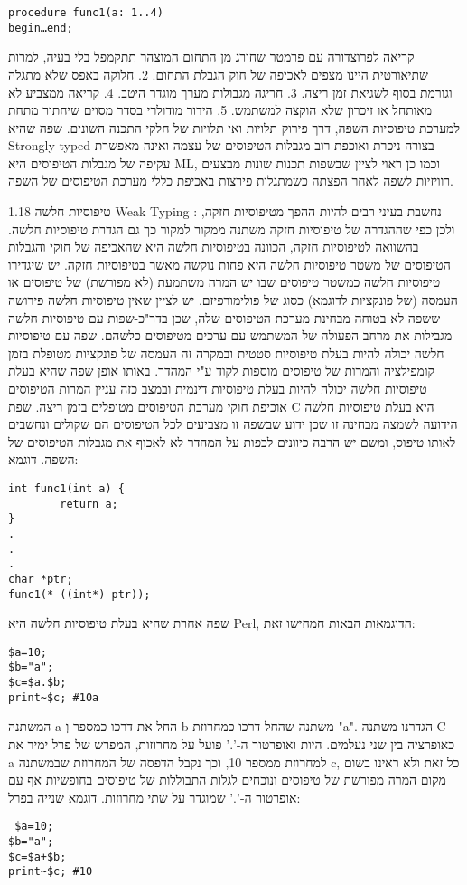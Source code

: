 \begin{verbatim}
procedure func1(a: 1..4)
begin…end;
\end{verbatim}

      קריאה לפרוצדורה עם פרמטר שחורג מן התחום המוצהר תתקמפל בלי בעיה, למרות שתיאורטית היינו מצפים לאכיפה של חוק הגבלת התחום.
      2. חלוקה באפס שלא מתגלה וגורמת בסוף לשגיאת זמן ריצה.
      3. חריגה מגבולות מערך מוגדר היטב.
      4. קריאה ממצביע לא מאותחל או זיכרון שלא הוקצה למשתמש.
      5. הידור מודולרי בסדר מסוים שיחתור מתחת למערכת טיפוסיות השפה, דרך פירוק תלויות ואי תלויות של חלקי התכנה השונים.
      שפה שהיא Strongly typed בצורה ניכרת ואוכפת רוב מגבלות הטיפוסים של עצמה ואינה מאפשרת עקיפה של מגבלות הטיפוסים היא ML, וכמו כן ראוי לציין שבשפות תכנות שונות מבצעים רוויזיות לשפה לאחר הפצתה כשמתגלות פירצות באכיפת כללי מערכת הטיפוסים של השפה.

      1.18 טיפוסיות חלשה Weak Typing :
      נחשבת בעיני רבים להיות ההפך מטיפוסיות חזקה, ולכן כפי שההגדרה של טיפוסיות חזקה משתנה ממקור למקור כך גם הגדרת טיפוסיות חלשה.
      בהשוואה לטיפוסיות חזקה, הכוונה בטיפוסיות חלשה היא שהאכיפה של חוקי והגבלות הטיפוסים של משטר טיפוסיות חלשה היא פחות נוקשה מאשר בטיפוסיות חזקה.
      יש שיגדירו טיפוסיות חלשה כמשטר טיפוסים שבו יש המרה משתמעת (לא מפורשת) של טיפוסים או העמסה (של פונקציות לדוגמא) כסוג של פולימורפיזם. יש לציין שאין טיפוסיות חלשה פירושה ששפה לא בטוחה מבחינת מערכת הטיפוסים שלה, שכן בדר"כ-שפות עם טיפוסיות חלשה מגבילות את מרחב הפעולה של המשתמש עם ערכים מטיפוסים כלשהם. שפה עם טיפוסיות חלשה יכולה להיות בעלת טיפוסיות סטטית ובמקרה זה העמסה של פונקציות מטופלת בזמן קומפילציה והמרות של טיפוסים מוספות לקוד ע"י המהדר.
      באותו אופן שפה שהיא בעלת טיפוסיות חלשה יכולה להיות בעלת טיפוסיות דינמית ובמצב כזה עניין המרות הטיפוסים אוכיפת חוקי מערכת הטיפוסים מטופלים בזמן ריצה.
      שפת C היא בעלת טיפוסיות חלשה הידועה לשמצה מבחינה זו שכן ידוע שבשפה זו מצביעים לכל הטיפוסים הם שקולים ונחשבים לאותו טיפוס, ומשם יש הרבה כיוונים לכפות על המהדר לא לאכוף את מגבלות הטיפוסים של השפה. דוגמא:

\begin{verbatim}
int func1(int a) {
        return a;
}
.
.
.
char *ptr;
func1(* ((int*) ptr));
\end{verbatim}

      שפה אחרת שהיא בעלת טיפוסיות חלשה היא Perl, הדוגמאות הבאות חמחישו זאת:
\begin{verbatim}
$a=10;
$b="a";
$c=$a.$b;
print~$c; #10a
\end{verbatim}

      המשתנה a החל את דרכו כמספר וְ-b משתנה שהחל דרכו כמחרוזת "a". הגדרנו משתנה C כאופרציה בין שני נעלמים. היות ואופרטור ה-'.' פועל על מחרוזות, המפרש של פרל ימיר את a למחרוזת ממספר 10, וכך נקבל הדפסה של המחרוזת שבמשתנה c, כל זאת ולא ראינו בשום מקום המרה מפורשת של טיפוסים ונוכחים לגלות התבוללות של טיפוסים בחופשיות אף עם אופרטור ה-'.' שמוגדר על שתי מחרוזות.
      דוגמא שנייה בפרל:
\begin{verbatim}
 $a=10;
$b="a";
$c=$a+$b;
print~$c; #10
\end{verbatim}

